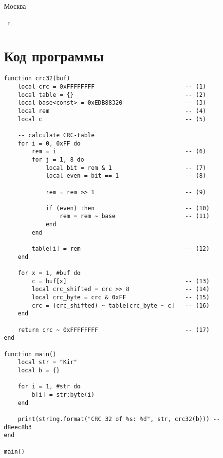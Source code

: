 \begin{center}
	\mbox{}
	\vfill
	Москва
\end{center}

\begin{center}
	\the\year ~г.
\end{center}
\clearpage


\section{Код программы}

\begin{lstlisting}[caption=Реализация алгоритма вычисления CRC-32, label=list:main, language={}]
function crc32(buf)
    local crc = 0xFFFFFFFF                          -- (1)
    local table = {}                                -- (2)
    local base<const> = 0xEDB88320                  -- (3)
    local rem                                       -- (4)
    local c                                         -- (5)

    -- calculate CRC-table
    for i = 0, 0xFF do                              
        rem = i                                     -- (6)
        for j = 1, 8 do    
            local bit = rem & 1                     -- (7)
            local even = bit == 1                   -- (8)
            
            rem = rem >> 1                          -- (9)

            if (even) then                          -- (10)
                rem = rem ~ base                    -- (11)
            end
        end

        table[i] = rem                              -- (12)
    end
   
    for x = 1, #buf do                              
        c = buf[x]                                  -- (13)
        local crc_shifted = crc >> 8                -- (14)
        local crc_byte = crc & 0xFF                 -- (15)
        crc = (crc_shifted) ~ table[crc_byte ~ c]   -- (16)
    end

    return crc ~ 0xFFFFFFFF                         -- (17)
end

function main()
    local str = "Kir"
    local b = {}

    for i = 1, #str do
        b[i] = str:byte(i)
    end

    print(string.format("CRC 32 of %s: %d", str, crc32(b))) -- d8eec8b3
end

main()
\end{lstlisting}

